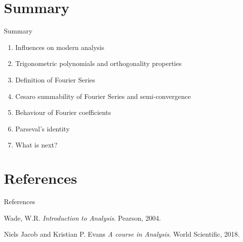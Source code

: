 \documentclass{beamer}
\begin{document}
\section{Summary}
\begin{frame}{Summary}
    \small
    \begin{enumerate}
        \item Influences on modern analysis
        \item Trigonometric polynomials and orthogonality properties
        \item Definition of Fourier Series
        \item Cesaro summability of Fourier Series and semi-convergence
        \item Behaviour of Fourier coefficients
        \item Parseval's identity
        \item What is next?
    \end{enumerate}
\end{frame}



\section{References}


\begin{frame}[allowframebreaks]{References}
\small
    \begin{thebibliography}{}


        Wade, W.R.
        \newblock \emph{Introduction to Analysis}.
        \newblock Pearson, 2004.

        Niels Jacob and Kristian P. Evans
        \newblock \emph{A course in Analysis}.
        \newblock World Scientific, 2018.


    \end{thebibliography}
\end{frame}
\end{document}
